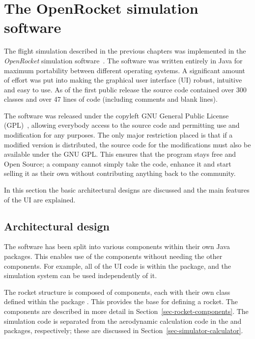 

\chapter{The OpenRocket simulation software}
\label{chap-software}

The flight simulation described in the previous chapters was
implemented in the {\it OpenRocket} simulation
software~\cite{openrocket}.  The software was written entirely in Java
for maximum portability between different operating systems.  A
significant amount of effort was put into making the graphical user
interface (UI) robust, intuitive and easy to use.  As of the first
public release the source code contained over 300 classes and over
47 lines of code (including comments and blank lines).

The software was released under the copyleft GNU General Public
License (GPL)~\cite{gnu-gpl}, allowing everybody access to the source code
and permitting use and modification for any purposes.  The only major
restriction placed is that if a modified version is distributed, the
source code for the modifications must also be available under the GNU
GPL.  This ensures that the program stays free and Open Source; a
company cannot simply take the code, enhance it and start selling it
as their own without contributing anything back to the community.

In this section the basic architectural designs are discussed and the
main features of the UI are explained.



\section{Architectural design}

The software has been split into various components within their own
Java packages.  This enables use of the components without needing the
other components.  For example, all of the UI code is within the
 package, and the simulation system can be used
independently of it.


The rocket structure is composed of components, each with their
own class defined within the package .  This
provides the base for defining a rocket.  The components are described
in more detail in Section~\ref{sec-rocket-components}.  The simulation
code is separated from the aerodynamic calculation code in the
 and  packages, respectively;
these are discussed in Section~\ref{sec-simulator-calculator}.

